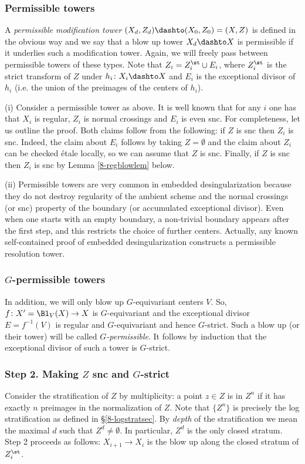 \documentclass[10pt]{../fichiers-configuration-latex/smfart}
\begin{document}
\subsubsection{Permissible towers}\label{8-permistowersec} A {\em
permissible modification tower} $(X_d,Z_d)\dashto(X_0,Z_0)=(X,Z)$
is defined in the obvious way and we say that a blow up tower
$X_d\dashto X$ is permissible if it underlies such a modification
tower. Again, we will freely pass between permissible towers of
these types. Note that $Z_i=Z^\st_i\cup E_i$, where $Z_i^\st$
is the strict transform of $Z$ under $h_i{\colon}X_i\dashto X$
and $E_i$ is the exceptional divisor of $h_i$ (i.e. the union of
the preimages of the centers of $h_i$).

\begin{remark2}\label{8-permisrem} (i) Consider a permissible tower
as above. It is well known that for any $i$ one has that $X_i$
is regular, $Z_i$ is normal crossings and $E_i$ is even snc. For
completeness, let us outline the proof. Both claims follow from
the following: if $Z$ is snc then $Z_i$ is snc. Indeed, the claim
about $E_i$ follows by taking $Z=\emptyset$ and the claim about
$Z_i$ can be checked \'etale locally, so we can assume that
$Z$ is snc. Finally, if $Z$ is snc then $Z_i$ is snc by Lemma
\ref{8-regblowlem} below.

(ii) Permissible towers are very common in embedded desingularization
because they do not destroy regularity of the ambient scheme and the
normal crossings (or snc) property of the boundary (or accumulated
exceptional divisor). Even when one starts with an empty boundary,
a non-trivial boundary appears after the first step, and this
restricts the choice of further centers. Actually, any known
self-contained proof of embedded desingularization constructs a
permissible resolution tower.  \end{remark2}

\subsubsection{$G$-permissible towers}\label{8-Gpermissec} In
addition, we will only blow up $G$-equivariant centers $V$. So,
$f{\colon}X'=\Bl_V(X)\to X$ is $G$-equivariant and the exceptional
divisor $E=f^{-1}(V)$ is regular and $G$-equivariant and hence
$G$-strict. Such a blow up (or their tower) will be called {\em
$G$-permissible}. It follows by induction that the exceptional
divisor of such a tower is $G$-strict.

\subsubsection{Step 2. Making $Z$ snc and $G$-strict}\label{8-step2}
Consider the stratification of $Z$ by multiplicity: a point $z\in Z$
is in $Z^n$ if it has exactly $n$ preimages in the normalization
of $Z$. Note that $\{Z^n\}$ is precisely the log stratification
as defined in \S\ref{8-logstratsec}. By
{\em depth} of the stratification we mean the maximal $d$ such
that $Z^d\neq\emptyset$. In particular, $Z^d$ is the only closed
stratum. Step 2 proceeds as follows: $X_{i+1}\to X_i$ is the blow
up along the closed stratum of $Z_i^\st$.
\end{document}
